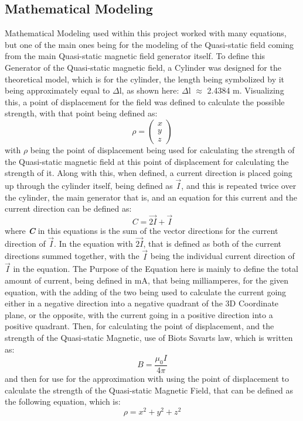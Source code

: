 \documentclass[]{article}
\begin{document}
\subsection{Mathematical Modeling}
Mathematical Modeling used within this project worked with many equations, but one of the main ones being for the modeling of the Quasi-static field coming from the main Quasi-static magnetic field generator itself. To define this Generator of the Quasi-static magnetic field, a Cylinder was designed for the theoretical model, which is for the cylinder, the length being symbolized by it being approximately equal to $\Delta$l, as shown here: $\Delta$l $\approx$ 2.4384 m. Visualizing this, a point of displacement for the field was defined to calculate the possible strength, with that point being defined as:
\[ \rho =  \left(\begin{array}{c}
x \\
y \\
z 
\end{array}\right)\]
with $\rho$ being the point of displacement being used for calculating the strength of the Quasi-static magnetic field at this point of displacement for calculating the strength of it. Along with this, when defined, a current direction is placed going up through the cylinder itself, being defined as $\vec{I}$, and this is repeated twice over the cylinder, the main generator that is, and an equation for this current and the current direction can be defined as:
\[C = \vec{2I} + \vec{I}\]
where \textbf{\textit{C}} in this equations is the sum of the vector directions for the current direction of $\vec{I}$. In the equation with $\vec{2I}$, that is defined as both of the current directions summed together, with the $\vec{I}$ being the individual current direction of $\vec{I}$ in the equation. The Purpose of the Equation here is mainly to define the total amount of current, being defined in mA, that being milliamperes, for the given equation, with the adding of the two being used to calculate the current going either in a negative direction into a negative quadrant of the 3D Coordinate plane, or the opposite, with the current going in a positive direction into a positive quadrant. Then, for calculating the point of displacement, and the strength of the Quasi-static Magnetic, use of Biots Savarts law, which is written as:
\[B = \frac{\mu_0I}{4\pi} \]
and then for use for the approximation with using the point of displacement to calculate the strength of the Quasi-static Magnetic Field, that can be defined as the following equation, which is: 
\[\rho = x^2+y^2+z^2 \]
\end{document}
